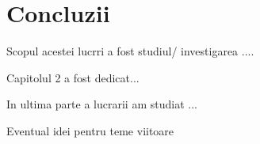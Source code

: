 \chapter{Concluzii
 }
\label{so}

\indent

Scopul acestei lucr\ab ri  a fost studiul/ investigarea ....

Capitolul 2 a fost dedicat...

In ultima parte a lucrarii am studiat ...

Eventual idei pentru teme viitoare
 




















